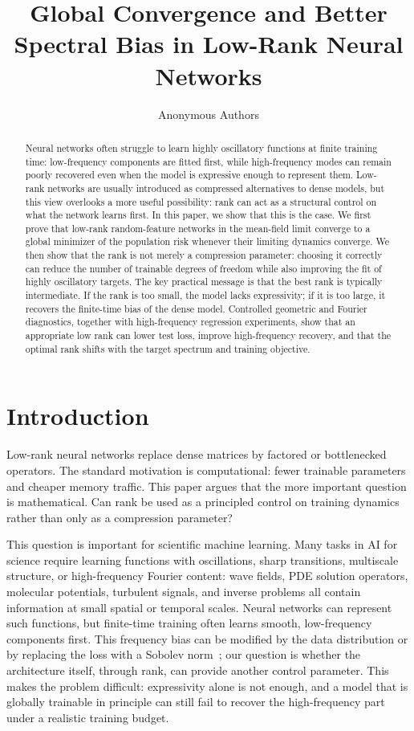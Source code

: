 \documentclass{article}
\title{Global Convergence and Better Spectral Bias in Low-Rank Neural Networks}
\author{Anonymous Authors}
\begin{document}
\maketitle

\begin{abstract}
Neural networks often struggle to learn highly oscillatory functions at finite training time: low-frequency components are fitted first, while high-frequency modes can remain poorly recovered even when the model is expressive enough to represent them. Low-rank networks are usually introduced as compressed alternatives to dense models, but this view overlooks a more useful possibility: rank can act as a structural control on what the network learns first. In this paper, we show that this is the case. We first prove that low-rank random-feature networks in the mean-field limit converge to a global minimizer of the population risk whenever their limiting dynamics converge. We then show that the rank is not merely a compression parameter: choosing it correctly can reduce the number of trainable degrees of freedom while also improving the fit of highly oscillatory targets. The key practical message is that the best rank is typically intermediate. If the rank is too small, the model lacks expressivity; if it is too large, it recovers the finite-time bias of the dense model. Controlled geometric and Fourier diagnostics, together with high-frequency regression experiments, show that an appropriate low rank can lower test loss, improve high-frequency recovery, and that the optimal rank shifts with the target spectrum and training objective.
\end{abstract}

\section{Introduction}
\label{sec:introduction}

Low-rank neural networks replace dense matrices by factored or bottlenecked operators. The standard motivation is computational: fewer trainable parameters and cheaper memory traffic. This paper argues that the more important question is mathematical. Can rank be used as a principled control on training dynamics rather than only as a compression parameter?

This question is important for scientific machine learning. Many tasks in AI for science require learning functions with oscillations, sharp transitions, multiscale structure, or high-frequency Fourier content: wave fields, PDE solution operators, molecular potentials, turbulent signals, and inverse problems all contain information at small spatial or temporal scales. Neural networks can represent such functions, but finite-time training often learns smooth, low-frequency components first. This frequency bias can be modified by the data distribution or by replacing the loss with a Sobolev norm~\cite{yu2022tuning}; our question is whether the architecture itself, through rank, can provide another control parameter. This makes the problem difficult: expressivity alone is not enough, and a model that is globally trainable in principle can still fail to recover the high-frequency part under a realistic training budget.
\end{document}
